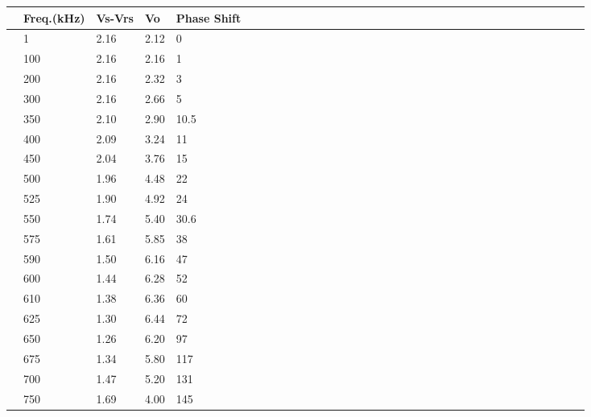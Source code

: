 \documentclass[10pt,twocolumn]{article}
\begin{document}
\begin{table}
	\begin{tabularx}{1\linewidth}{ lXXXX|cXXXXXXXXXXXXXXXXXXXXXXXXXXXXX }
		\hline
		 & \textbf{Freq.(kHz)} & \textbf{Vs-Vrs} & \textbf{Vo} & \textbf{Phase Shift}\\
		\hline
		& 1 & 2.16 & 2.12 & 0 \\
	 
		\cline{1-5}
		& 100 & 2.16 & 2.16 & 1 \\
	
		\cline{1-5}
		& 200 & 2.16 & 2.32 & 3 \\
		
		\cline{1-5}
		& 300 & 2.16 & 2.66 & 5 \\
		
		\cline{1-5}
		& 350 & 2.10 & 2.90 & 10.5 \\
		
		\cline{1-5}
		& 400 & 2.09 & 3.24 & 11 \\
		
		\cline{1-5}
		& 450 & 2.04 & 3.76 & 15\\
		
		\cline{1-5}
		& 500 & 1.96 & 4.48 & 22 \\
	
		\cline{1-5}
		& 525 & 1.90 & 4.92 & 24 \\
		
		\cline{1-5}
		& 550 & 1.74 & 5.40 & 30.6 \\
		
		\cline{1-5}
		& 575 & 1.61 & 5.85 & 38 \\
		
		\cline{1-5}
		& 590 & 1.50 & 6.16 & 47 \\
		
		\cline{1-5}
		& 600 & 1.44 & 6.28 & 52 \\
		
		\cline{1-5}
		& 610 & 1.38 & 6.36 & 60 \\
	
		\cline{1-5}
		& 625 & 1.30 & 6.44 & 72 \\
		
		\cline{1-5}
		& 650 & 1.26  & 6.20 & 97 \\		
		\cline{1-5}
		& 675 & 1.34 & 5.80 & 117 \\
		
		\cline{1-5}
		& 700 & 1.47 & 5.20 & 131 \\
		
		\cline{1-5}
		& 750 & 1.69 & 4.00 & 145 \\
		

\end{tabularx}
\end{table}
\end{document}
